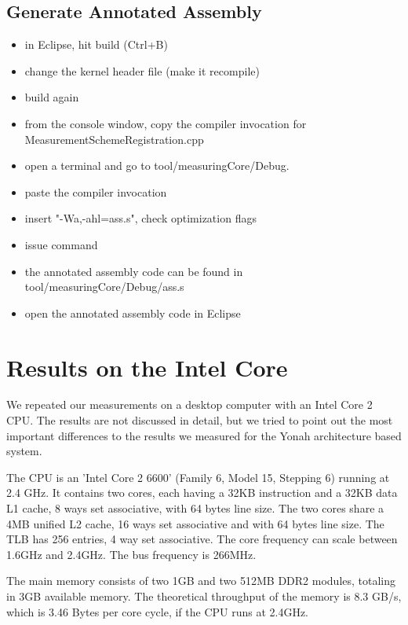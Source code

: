 \documentclass[a4paper,12pt]{article}
\begin{document}
\subsection{Generate Annotated Assembly}
\begin{itemize}
\item in Eclipse, hit build (Ctrl+B)
\item change the kernel header file (make it recompile)
\item build again
\item from the console window, copy the compiler invocation for
MeasurementSchemeRegistration.cpp
\item open a terminal and go to tool/measuringCore/Debug.
\item paste the compiler invocation
\item insert "-Wa,-ahl=ass.s", check optimization flags
\item issue command
\item the annotated assembly code can be found in tool/measuringCore/Debug/ass.s
\item open the annotated assembly code in Eclipse
\end{itemize}

\section{Results on the Intel Core}
\label{sec:resultsIntelCore}
We repeated our measurements on a desktop computer with an Intel Core 2 CPU. The
results are not discussed in detail, but we tried to point out the most
important differences to the results we measured for the Yonah architecture
based system.

The CPU is an 'Intel Core 2 6600' (Family 6, Model 15, Stepping 6) running at
2.4 GHz. It contains two cores, each having a 32KB instruction and a 32KB data
L1 cache, 8 ways set associative, with 64 bytes line size. The two cores share a
4MB unified L2 cache, 16 ways set associative and with 64 bytes line size. The
TLB has 256 entries, 4 way set associative. The core frequency can scale between
1.6GHz and 2.4GHz. The bus frequency is 266MHz.

The main memory consists of two 1GB and two 512MB DDR2 modules, totaling in 3GB
available memory. The theoretical throughput of the memory is 8.3 GB/s, which is
3.46 Bytes per core cycle, if the CPU runs at 2.4GHz.
\end{document}
